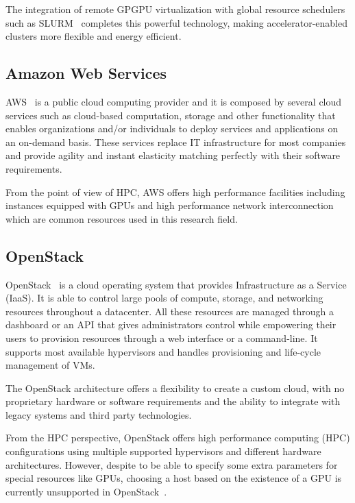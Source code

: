 \documentclass[a4paper,twoside]{article}
\begin{document}
The integration of remote GPGPU virtualization with global
resource schedulers such as SLURM~\cite{sbacpad14} completes this powerful
technology, making accelerator-enabled clusters more flexible and
energy efficient.

\subsection{Amazon Web Services}
\label{sec:aws}
AWS~\cite{aws} is a public cloud computing provider
and it is composed by several cloud services such as 
 cloud-based computation, storage and other functionality 
that enables organizations and/or individuals to deploy
services and applications on an on-demand basis. 
These services replace IT infrastructure for most companies and provide agility and instant elasticity matching 
perfectly with their software requirements.

From the point of view of HPC, AWS offers high performance facilities including 
instances equipped with GPUs and high performance network interconnection which 
are common resources used in this research field.

\subsection{OpenStack}
\label{sec:openstack}

OpenStack~\cite{OpenStack} is a cloud operating system that provides Infrastructure as a Service (IaaS). 
It is able to control large pools of compute, storage, and networking resources throughout a 
datacenter. All these resources are managed through a dashboard or an API that gives administrators 
control while empowering their users to provision resources through a web interface
or a command-line. 
It supports most available hypervisors and handles provisioning 
and life-cycle management of VMs.
 
The OpenStack architecture offers a flexibility to create a custom cloud, with no proprietary hardware
or software requirements and the ability to integrate with legacy systems and third party technologies. 

From the HPC perspective, OpenStack offers high performance computing (HPC) configurations using
multiple supported hypervisors and different hardware architectures. However, despite to be able to
specify some extra parameters for special resources like GPUs, choosing a host based on the existence
of a GPU is currently unsupported in OpenStack~\cite{OpenStackGPU}. 
\end{document}
